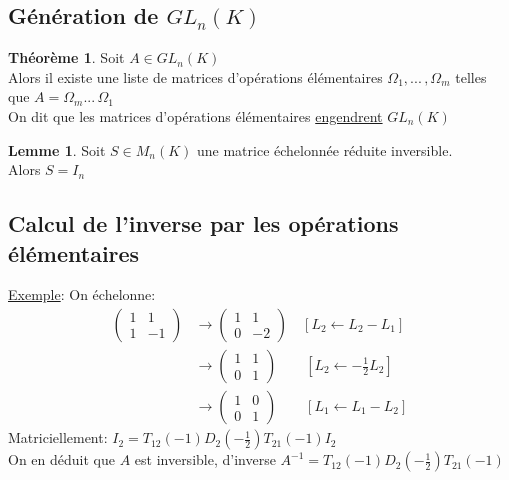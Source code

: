 \documentclass[10pt,a4paper]{article}
\theoremstyle{definition}
\newtheorem{theorem}[proposition]{Théorème}
\newtheorem{lemme}[proposition]{Lemme}
\begin{document}
\subsection{Génération de $GL_n(K)$}
\begin{theorem}
Soit $A \in GL_n(K)$ \\
Alors il existe une liste de matrices d'opérations élémentaires $\Omega_1, ...\,, \Omega_m$ telles que $A = \Omega_m ...\, \Omega_1$ \\
On dit que les matrices d'opérations élémentaires \uline{engendrent} $GL_n(K)$
\end{theorem}
\begin{lemme}
Soit $S \in M_n(K)$ une matrice échelonnée réduite inversible. \\
Alors $S = I_n$
\end{lemme}

\subsection{Calcul de l'inverse par les opérations élémentaires}
\noindent \uline{Exemple}: On échelonne:
\begin{align*}
\begin{pmatrix}
1 & 1 \\
1 & -1
\end{pmatrix} &\rightarrow \begin{pmatrix}
1 & 1 \\
0 & -2
\end{pmatrix} \quad [L_2 \leftarrow L_2 - L_1] \\
&\rightarrow \begin{pmatrix}
1 & 1 \\
0 & 1
\end{pmatrix} \quad \quad [L_2 \leftarrow -\frac{1}{2}L_2] \\
&\rightarrow \begin{pmatrix}
1 & 0 \\
0 & 1
\end{pmatrix} \quad \quad [L_1 \leftarrow L_1 - L_2]
\end{align*}
Matriciellement: $I_2 = T_{12}(-1) D_2(-\frac{1}{2}) T_{21}(-1)I_2$ \\
On en déduit que $A$ est inversible, d'inverse $A^{-1} = T_{12}(-1) D_2(-\frac{1}{2}) T_{21}(-1)$ \medskip
\end{document}
